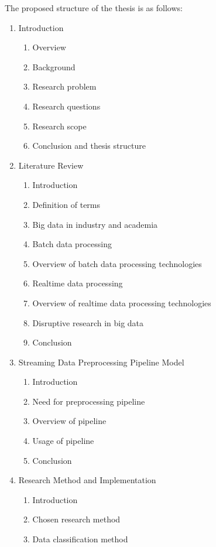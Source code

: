 \documentclass[a4paper,11pt]{article}
\begin{document}
The proposed structure of the thesis is as follows:

\begin{enumerate}
  \item Introduction
  \begin{enumerate}[label*=\arabic*.]
    \item Overview
    \item Background
    \item Research problem
    \item Research questions
    \item Research scope
    \item Conclusion and thesis structure
  \end{enumerate}
  \item Literature Review
  \begin{enumerate}[label*=\arabic*.]
    \item Introduction
    \item Definition of terms
    \item Big data in industry and academia
    \item Batch data processing
    \item Overview of batch data processing technologies
    \item Realtime data processing
    \item Overview of realtime data processing technologies
    \item Disruptive research in big data
    \item Conclusion
  \end{enumerate}
  \item Streaming Data Preprocessing Pipeline Model
  \begin{enumerate}[label*=\arabic*.]
    \item Introduction
    \item Need for preprocessing pipeline
    \item Overview of pipeline
    \item Usage of pipeline
    \item Conclusion
  \end{enumerate}
  \item Research Method and Implementation
  \begin{enumerate}[label*=\arabic*.]
    \item Introduction
    \item Chosen research method
    \item Data classification method

\end{enumerate}
\end{enumerate}
\end{document}
